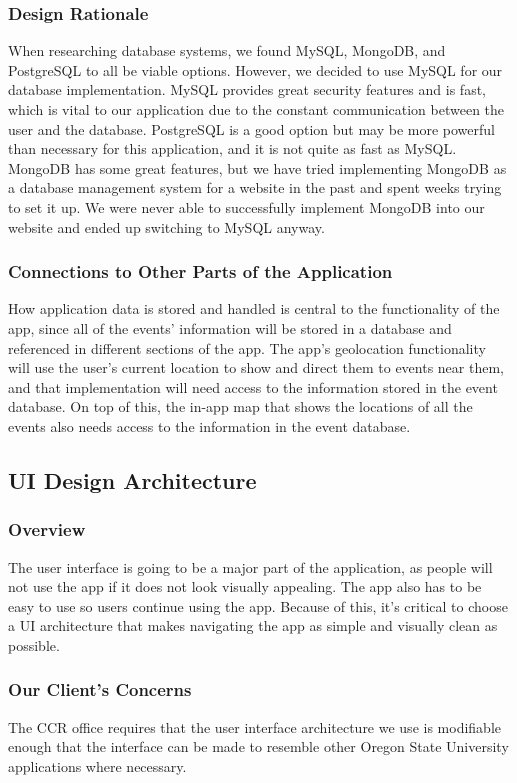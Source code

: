 \documentclass[draftclsnofoot, onecolumn, 10pt, compsoc]{IEEEtran}
\begin{document}
			\subsubsection{Design Rationale}
				When researching database systems, we found MySQL, MongoDB, and PostgreSQL to all be viable options. However, we decided to use MySQL for our database implementation. MySQL provides great security features and is fast, which is vital to our application due to the constant communication between the user and the database. PostgreSQL is a good option but may be more powerful than necessary for this application, and it is not quite as fast as MySQL. MongoDB has some great features, but we have tried implementing MongoDB as a database management system for a website in the past and spent weeks trying to set it up. We were never able to successfully implement MongoDB into our website and ended up switching to MySQL anyway.
			\subsubsection{Connections to Other Parts of the Application}
				How application data is stored and handled is central to the functionality of the app, since all of the events' information will be stored in a database and referenced in different sections of the app. The app's geolocation functionality will use the user's current location to show and direct them to events near them, and that implementation will need access to the information stored in the event database. On top of this, the in-app map that shows the locations of all the events also needs access to the information in the event database.
				~\cite{MySQL}
				~\cite{MySQL_vs_Postgres}

		\subsection{UI Design Architecture}
			\subsubsection{Overview}
				The user interface is going to be a major part of the application, as people will not use the app if it does not look visually appealing. The app also has to be easy to use so users continue using the app. Because of this, it's critical to choose a UI architecture that makes navigating the app as simple and visually clean as possible.
			\subsubsection{Our Client's Concerns}
				The CCR office requires that the user interface architecture we use is modifiable enough that the interface can be made to resemble other Oregon State University applications where necessary.
\end{document}
